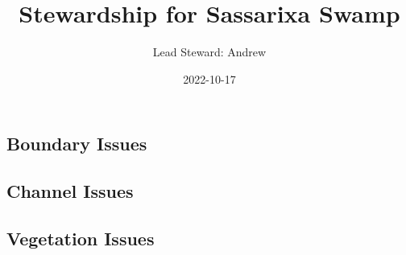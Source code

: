 \documentclass[
  landscape]{article}
\title{Stewardship for Sassarixa Swamp}
\author{Lead Steward: Andrew}
\date{2022-10-17}
\begin{document}
\maketitle

\hypertarget{boundary-issues}{%
\subsection{Boundary Issues}\label{boundary-issues}}

\textbar\textbar{} \textbar\textbar{} \textbar\textbar{}
\textbar\textbar{}

\hypertarget{channel-issues}{%
\subsection{Channel Issues}\label{channel-issues}}

\textbar\textbar{} \textbar\textbar{} \textbar\textbar{}
\textbar\textbar{}

\newpage

\hypertarget{vegetation-issues}{%
\subsection{Vegetation Issues}\label{vegetation-issues}}
\end{document}
